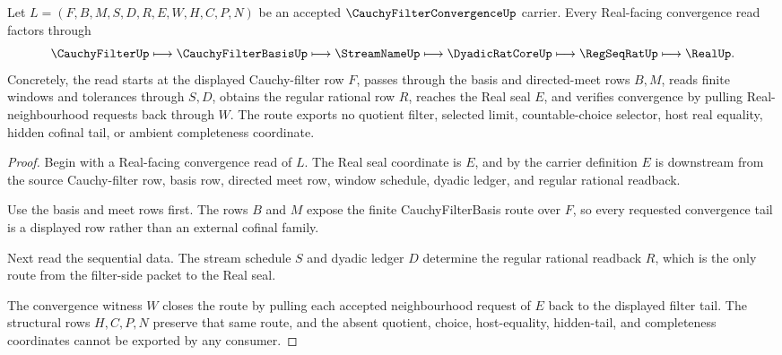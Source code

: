 \begin{theorem}
\label{thm:cauchy-filter-convergence-limit-route}
Let $L=(F,B,M,S,D,R,E,W,H,C,P,N)$ be an accepted $\CauchyFilterConvergenceUp$ carrier. Every Real-facing convergence read factors through
$$
\CauchyFilterUp \longmapsto \CauchyFilterBasisUp \longmapsto \StreamNameUp \longmapsto \DyadicRatCoreUp \longmapsto \RegSeqRatUp \longmapsto \RealUp .
$$
Concretely, the read starts at the displayed Cauchy-filter row $F$, passes through the basis and directed-meet rows $B,M$, reads finite windows and tolerances through $S,D$, obtains the regular rational row $R$, reaches the Real seal $E$, and verifies convergence by pulling Real-neighbourhood requests back through $W$. The route exports no quotient filter, selected limit, countable-choice selector, host real equality, hidden cofinal tail, or ambient completeness coordinate.
\end{theorem}
\begin{proof}
Begin with a Real-facing convergence read of $L$. The Real seal coordinate is $E$, and by the carrier definition $E$ is downstream from the source Cauchy-filter row, basis row, directed meet row, window schedule, dyadic ledger, and regular rational readback.

Use the basis and meet rows first. The rows $B$ and $M$ expose the finite CauchyFilterBasis route over $F$, so every requested convergence tail is a displayed row rather than an external cofinal family.

Next read the sequential data. The stream schedule $S$ and dyadic ledger $D$ determine the regular rational readback $R$, which is the only route from the filter-side packet to the Real seal.

The convergence witness $W$ closes the route by pulling each accepted neighbourhood request of $E$ back to the displayed filter tail. The structural rows $H,C,P,N$ preserve that same route, and the absent quotient, choice, host-equality, hidden-tail, and completeness coordinates cannot be exported by any consumer.
\end{proof}



